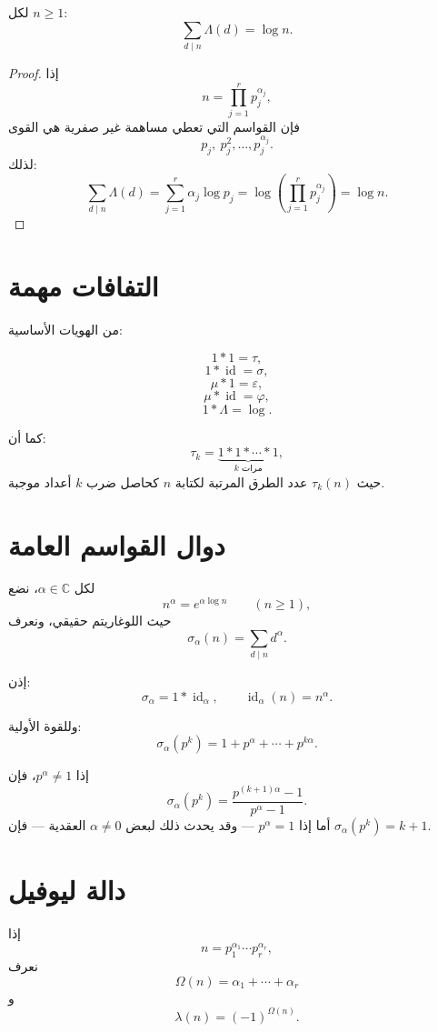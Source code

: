 \begin{theorem}
\label{thm:von-mangoldt-divisor-sum}
\provedhere
لكل \(n\geq1\):
\[
\sum_{d\mid n}\Lambda(d)=\log n.
\]
\end{theorem}

\begin{proof}
إذا
\[
n=\prod_{j=1}^{r}p_j^{\alpha_j},
\]
فإن القواسم التي تعطي مساهمة غير صفرية هي القوى
\[
p_j,\ p_j^2,\dots,p_j^{\alpha_j}.
\]
لذلك:
\[
\sum_{d\mid n}\Lambda(d)
=
\sum_{j=1}^{r}\alpha_j\log p_j
=
\log\left(\prod_{j=1}^{r}p_j^{\alpha_j}\right)
=
\log n.
\]
\end{proof}

\section{التفافات مهمة}

من الهويات الأساسية:

\[
1*1=\tau,
\]
\[
1*\operatorname{id}=\sigma,
\]
\[
\mu*1=\varepsilon,
\]
\[
\mu*\operatorname{id}=\varphi,
\]
\[
1*\Lambda=\log.
\]

كما أن:
\[
\tau_k
=
\underbrace{1*1*\cdots*1}_{k\text{ مرات}},
\]
حيث \(\tau_k(n)\) عدد الطرق المرتبة لكتابة \(n\) كحاصل ضرب \(k\) أعداد موجبة.

\section{دوال القواسم العامة}

لكل \(\alpha\in\mathbb{C}\)، نضع
\[
n^\alpha=e^{\alpha\log n}
\qquad(n\geq1),
\]
حيث اللوغاريتم حقيقي، ونعرف
\[
\sigma_\alpha(n)
=
\sum_{d\mid n}d^\alpha.
\]

إذن:
\[
\sigma_\alpha
=
1*\operatorname{id}_\alpha,
\qquad
\operatorname{id}_\alpha(n)=n^\alpha.
\]

وللقوة الأولية:
\[
\sigma_\alpha(p^k)
=
1+p^\alpha+\cdots+p^{k\alpha}.
\]

إذا \(p^\alpha\neq1\)، فإن
\[
\sigma_\alpha(p^k)
=
\frac{p^{(k+1)\alpha}-1}{p^\alpha-1}.
\]
أما إذا \(p^\alpha=1\) --- وقد يحدث ذلك لبعض \(\alpha\neq0\)
العقدية --- فإن \(\sigma_\alpha(p^k)=k+1\).

\section{دالة ليوفيل}

\begin{definition}
إذا
\[
n=p_1^{\alpha_1}\cdots p_r^{\alpha_r},
\]
نعرف
\[
\Omega(n)=\alpha_1+\cdots+\alpha_r
\]
و
\[
\lambda(n)=(-1)^{\Omega(n)}.
\]
\end{definition}

